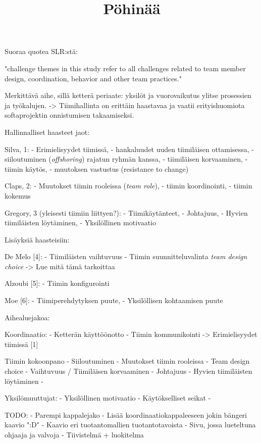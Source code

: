 \title{Pöhinää}

Suoraa quotea SLR:stä: 

"challenge themes in this study refer to all challenges related to team member design, coordination, behavior and other team practices."

Merkittävä aihe, sillä ketterä periaate: yksilöt ja vuorovaikutus ylitse prosessien ja työkalujen.
-> Tiimihallinta on erittäin haastavaa ja vaatii erityishuomiota softaprojektin onnistumisen takaamiseksi.


Hallinnalliset haasteet jaot:

Silva, 1: 
- Erimielisyydet tiimissä, 
- hankaluudet uuden tiimiläisen ottamisessa, 
- siiloutuminen (\textit{offshoring}) rajatun ryhmän kanssa, 
- tiimiläisen korvaaminen, 
- tiimin käytös, 
- muutoksen vastustus (resistance to change)

Claps, 2:
- Muutokset tiimin rooleissa (\textit{team role}), 
- tiimin koordinointi, 
- tiimin kokemus

Gregory, 3 (yleisesti tiimiin liittyen?):
- Tiimikäytänteet,
- Johtajuus,
- Hyvien tiimiläisten löytäminen,
- Yksilöllinen motivaatio


Lisäyksiä haasteisiin:

De Melo [4]:
- Tiimiläisten vaihtuvuus
- Tiimin suunnitteluvalinta \textit{team design choice}
-> Lue mitä tämä tarkoittaa

Alzoubi [5]:
- Tiimin konfigurointi

Moe [6]:
- Tiimiperehdytyksen puute,
- Yksilöllisen kohtaamisen puute


Aihealuejakoa:

Koordinaatio:
- Ketterän käyttöönotto
- Tiimin kommunikointi
-> Erimielisyydet tiimissä [1]

Tiimin kokoonpano
- Siiloutuminen
- Muutokset tiimin rooleissa
- Team design choice
- Vaihtuvuus / Tiimiläisen korvaaminen
- Johtajuus
- Hyvien tiimiläisten löytäminen
- 

Yksilömuuttujat:
- Yksilöllinen motivaatio
- Käytökselliset seikat
- 


TODO:
- Parempi kappalejako
- Lisää koordinaatiokappaleeseen jokin bängeri kaavio ":D"
- Kaavio eri tuotantomallien tuotantotavoista
- Sivu, jossa lueteltuna ohjaaja ja valvoja
- Tiivistelmä + luokitelma
